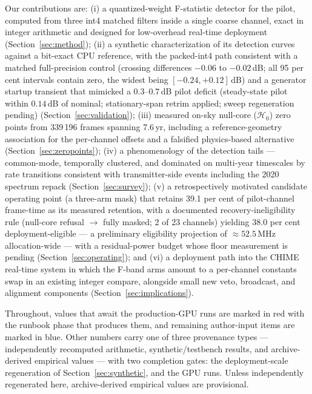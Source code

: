 Our contributions are:
(i) a quantized-weight F-statistic detector for the pilot, computed from
three int4 matched filters inside a single coarse channel, exact in integer
arithmetic and designed for low-overhead real-time deployment
(Section~\ref{sec:method});
(ii) a synthetic characterization of its detection curves against a
bit-exact CPU reference, with the packed-int4 path consistent with a
matched full-precision control (crossing differences $-0.06$ to
$-0.02$\,dB; all 95 per cent intervals contain zero, the widest being
$[-0.24, +0.12]$\,dB) and a generator startup transient that mimicked
a $0.3$--$0.7$\,dB pilot deficit (steady-state pilot within
$0.14$\,dB of nominal; stationary-span retrim applied; sweep
regeneration pending)
(Section~\ref{sec:validation});
(iii) measured on-sky null-core ($\mathcal{H}_0$) zero points from
339\,196 frames spanning 7.6\,yr,
including a reference-geometry association for the per-channel offsets and
a falsified physics-based alternative (Section~\ref{sec:zeropoints});
(iv) a phenomenology of the detection tails --- common-mode, temporally
clustered, and dominated on multi-year timescales by rate transitions
consistent with transmitter-side events including the 2020 spectrum repack
(Section~\ref{sec:survey});
(v) a retrospectively motivated candidate operating point (a
three-arm mask) that retains
39.1 per cent of pilot-channel frame-time as its measured retention,
with a documented recovery-ineligibility rule (null-core refusal
$\rightarrow$ fully masked; 2 of 23 channels) yielding 38.0 per cent
deployment-eligible --- a
preliminary eligibility projection of $\approx 52.5$\,MHz allocation-wide
--- with a residual-power budget whose floor measurement is pending
(Section~\ref{sec:operating});
and (vi) a deployment path into the CHIME real-time system in which the
F-band arms amount to a per-channel constants swap in an existing integer
compare, alongside small new veto, broadcast, and alignment components
(Section~\ref{sec:implications}).

Throughout, values that await the production-GPU runs are marked in red
with the runbook phase that produces them, and remaining author-input
items are marked in blue. Other numbers carry one of three provenance
types --- independently recomputed arithmetic, synthetic/testbench
results, and archive-derived empirical values --- with two completion
gates: the deployment-scale regeneration of
Section~\ref{sec:synthetic}, and the GPU runs. Unless independently
regenerated here, archive-derived empirical values are provisional.

